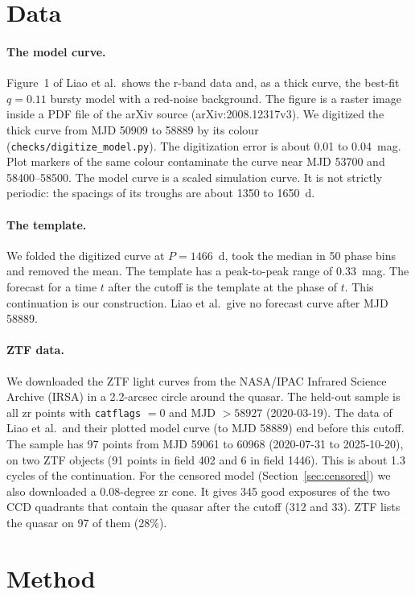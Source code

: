 \documentclass[11pt]{article}
\begin{document}
\section{Data}

\paragraph{The model curve.} Figure~1 of Liao et al.\ shows the r-band data and, as a thick curve, the best-fit $q = 0.11$ bursty model with a red-noise background. The figure is a raster image inside a PDF file of the arXiv source (arXiv:2008.12317v3). We digitized the thick curve from MJD 50909 to 58889 by its colour (\texttt{checks/digitize\_model.py}). The digitization error is about 0.01 to 0.04~mag. Plot markers of the same colour contaminate the curve near MJD 53700 and 58400--58500. The model curve is a scaled simulation curve. It is not strictly periodic: the spacings of its troughs are about 1350 to 1650~d.

\paragraph{The template.} We folded the digitized curve at $P = 1466$~d, took the median in 50 phase bins and removed the mean. The template has a peak-to-peak range of 0.33~mag. The forecast for a time $t$ after the cutoff is the template at the phase of $t$. This continuation is our construction. Liao et al.\ give no forecast curve after MJD 58889.

\paragraph{ZTF data.} We downloaded the ZTF light curves from the NASA/IPAC Infrared Science Archive (IRSA) \cite{bellm2019,masci2019} in a 2.2-arcsec circle around the quasar. The held-out sample is all zr points with \texttt{catflags} $= 0$ and MJD $> 58927$ (2020-03-19). The data of Liao et al.\ and their plotted model curve (to MJD 58889) end before this cutoff. The sample has 97 points from MJD 59061 to 60968 (2020-07-31 to 2025-10-20), on two ZTF objects (91 points in field 402 and 6 in field 1446). This is about 1.3 cycles of the continuation. For the censored model (Section~\ref{sec:censored}) we also downloaded a 0.08-degree zr cone. It gives 345 good exposures of the two CCD quadrants that contain the quasar after the cutoff (312 and 33). ZTF lists the quasar on 97 of them (28\%).

\section{Method}
\end{document}
